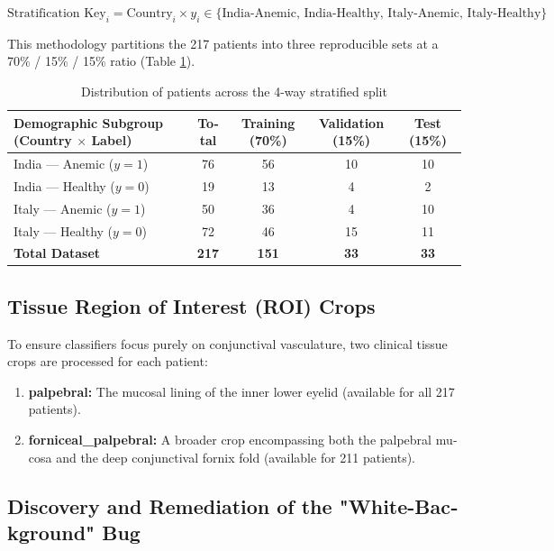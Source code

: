 \documentclass{article}
\begin{document}
\begin{latin}
		\begin{equation}
			\text{Stratification Key}_i = \text{Country}_i \times y_i \in \{\text{India-Anemic, India-Healthy, Italy-Anemic, Italy-Healthy}\}
		\end{equation}
		
		This methodology partitions the 217 patients into three reproducible sets at a 70\% / 15\% / 15\% ratio (Table \ref{tab:data_split}).
		
		\begin{table}[htbp]
			\centering
			\caption{Distribution of patients across the 4-way stratified split}
			\label{tab:data_split}
			\begin{tabular}{lcccc}
				\toprule
				\textbf{Demographic Subgroup (Country $\times$ Label)} & \textbf{Total} & \textbf{Training (70\%)} & \textbf{Validation (15\%)} & \textbf{Test (15\%)} \\
				\midrule
				India — Anemic ($y=1$) & 76 & 56 & 10 & 10 \\
				India — Healthy ($y=0$) & 19 & 13 & 4 & 2 \\
				Italy — Anemic ($y=1$) & 50 & 36 & 4 & 10 \\
				Italy — Healthy ($y=0$) & 72 & 46 & 15 & 11 \\
				\midrule
				\textbf{Total Dataset} & \textbf{217} & \textbf{151} & \textbf{33} & \textbf{33} \\
				\bottomrule
			\end{tabular}
		\end{table}
		
		\subsection{Tissue Region of Interest (ROI) Crops}
		To ensure classifiers focus purely on conjunctival vasculature, two clinical tissue crops are processed for each patient:
		\begin{enumerate}
			\item \textbf{palpebral:} The mucosal lining of the inner lower eyelid (available for all 217 patients).
			\item \textbf{forniceal\_palpebral:} A broader crop encompassing both the palpebral mucosa and the deep conjunctival fornix fold (available for 211 patients).
		\end{enumerate}
		
		\subsection{Discovery and Remediation of the "White-Background" Bug}
		

\end{latin}
\end{document}
